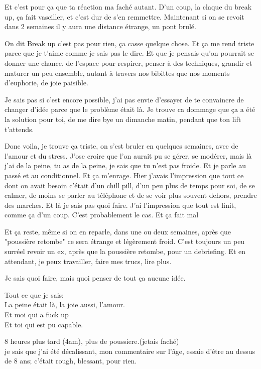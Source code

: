 Et c'est pour ça que ta réaction ma faché autant. D'un coup, la claque du break
up, ça fait vasciller, et c'est dur de s'en remmettre.  Maintenant si on se
revoit dans 2 semaines il y aura une distance étrange, un pont brulé.

On dit Break up c'est pas pour rien, ça casse quelque chose.  Et ça me rend
triste parce que je t'aime comme je sais pas le dire.  Et que je pensais qu'on
pourrait se donner une chance, de l'espace pour respirer, penser à des
techniques, grandir et maturer un peu ensemble, autant à travers nos bibittes
que nos moments d'euphorie, de joie paisible.

Je sais pas si c'est encore possible, j'ai pas envie d'essayer de te convaincre
de changer d'idée parce que le problème était là.  Je trouve ca dommage que ça
a été la solution pour toi, de me dire bye un dimanche matin, pendant que ton lift
t'attends. 

Donc voila, je trouve ça triste, on s'est bruler en quelques semaines, avec de
l'amour et du stress. J'ose croire que l'on aurait pu se gérer, se modérer, mais là j'ai de
la peine, tu as de la peine, je sais que tu n'est pas froide.  Et je parle au
passé et au conditionnel. Et ça m'enrage.  Hier j'avais l'impression que tout
ce dont on avait besoin c'était d'un chill pill, d'un peu plus de temps pour
soi, de se calmer, de moins se parler au téléphone et de se voir plus souvent
dehors, prendre des marches.  Et là je sais pas quoi faire.  J'ai l'impression
que tout est finit, comme ça d'un coup.  C'est probablement le cas.  Et ça fait mal

Et ça reste, même si on en reparle, dans une ou deux
semaines, après que "poussière retombe" ce sera étrange et légèrement froid.
C'est toujours un peu surréel revoir un ex, après que la poussière retombe,
pour un debriefing. 
Et en attendant, je peux travailler, faire mes trucs, lire plus.

Je sais quoi faire, mais quoi penser de tout ça aucune idée.

Tout ce que je sais:\\
La peine était là, la joie aussi, l'amour. \\
Et moi qui a fuck up\\
Et toi qui est pu capable.

\clearpage

8 heures plus tard (4am), plus de poussiere.(jetais faché)\\

je sais que j'ai été décalissant, mon commentaire sur l'âge, essaie d'être
au dessus de 8 ans; c'était rough, blessant, pour rien. \\

